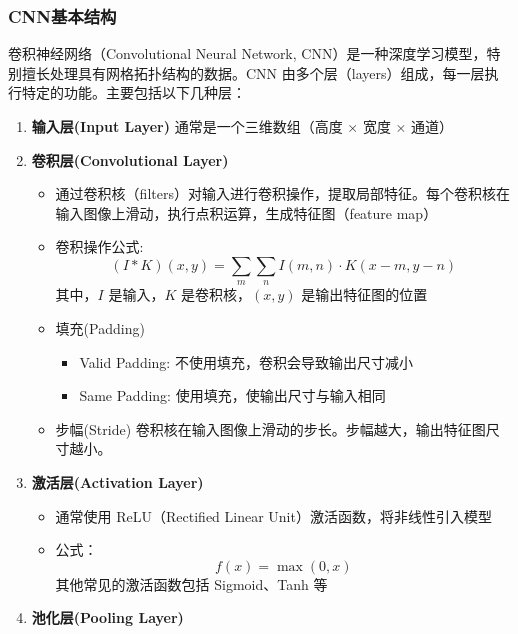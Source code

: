 \subsubsection{CNN基本结构}
卷积神经网络（Convolutional Neural Network, CNN）是一种深度学习模型，特别擅长处理具有网格拓扑结构的数据。CNN 由多个层（layers）组成，每一层执行特定的功能。主要包括以下几种层：
\begin{enumerate}
    \item \textbf{输入层(Input Layer)}\newline
    通常是一个三维数组（高度 × 宽度 × 通道）
    \item \textbf{卷积层(Convolutional Layer)}
    \begin{itemize}
        \item 通过卷积核（filters）对输入进行卷积操作，提取局部特征。每个卷积核在输入图像上滑动，执行点积运算，生成特征图（feature map）
        \item 卷积操作公式:
        \begin{equation}
            (I \ast K)(x, y) = \sum_m \sum_n I(m, n) \cdot K(x - m, y - n)
        \end{equation}
        其中，\( I \) 是输入，\( K \) 是卷积核，\((x, y)\) 是输出特征图的位置
        \item 填充(Padding)
        \begin{itemize}
            \item Valid Padding: 不使用填充，卷积会导致输出尺寸减小
            \item Same Padding: 使用填充，使输出尺寸与输入相同
        \end{itemize}
        \item 步幅(Stride)\newline
        卷积核在输入图像上滑动的步长。步幅越大，输出特征图尺寸越小。
    \end{itemize}
    \item \textbf{激活层(Activation Layer)}
    \begin{itemize}
        \item 通常使用 ReLU（Rectified Linear Unit）激活函数，将非线性引入模型
        \item 公式：
        \begin{equation}
            f(x) = \max(0, x)
        \end{equation}
        其他常见的激活函数包括 Sigmoid、Tanh 等
    \end{itemize}
    \item \textbf{池化层(Pooling Layer)}\newline

\end{enumerate}
